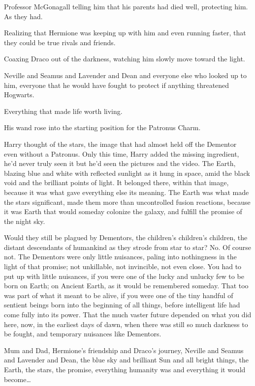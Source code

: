 Professor McGonagall telling him that his parents had died well, protecting 
him. As they had.

Realizing that Hermione was keeping up with him and even running faster, that 
they could be true rivals and friends.

Coaxing Draco out of the darkness, watching him slowly move toward the light.

Neville and Seamus and Lavender and Dean and everyone else who looked up to 
him, everyone that he would have fought to protect if anything threatened 
Hogwarts.

Everything that made life worth living.

His wand rose into the starting position for the Patronus Charm.

Harry thought of the stars, the image that had almost held off the Dementor 
even without a Patronus. Only this time, Harry added the missing ingredient, 
he'd never truly seen it but he'd seen the pictures and the video. The Earth, 
blazing blue and white with reflected sunlight as it hung in space, amid the 
black void and the brilliant points of light. It belonged there, within that 
image, because it was what gave everything else its meaning. The Earth was what 
made the stars significant, made them more than uncontrolled fusion reactions, 
because it was Earth that would someday colonize the galaxy, and fulfill the 
promise of the night sky.

Would they still be plagued by Dementors, the children's children's children, 
the distant descendants of humankind as they strode from star to star? No. Of 
course not. The Dementors were only little nuisances, paling into nothingness 
in the light of that promise; not unkillable, not invincible, not even close. 
You had to put up with little nuisances, if you were one of the lucky and 
unlucky few to be born on Earth; on Ancient Earth, as it would be remembered 
someday. That too was part of what it meant to be alive, if you were one of the 
tiny handful of sentient beings born into the beginning of all things, before 
intelligent life had come fully into its power. That the much vaster future 
depended on what you did here, now, in the earliest days of dawn, when there 
was still so much darkness to be fought, and temporary nuisances like Dementors.

Mum and Dad, Hermione's friendship and Draco's journey, Neville and Seamus and 
Lavender and Dean, the blue sky and brilliant Sun and all bright things, the 
Earth, the stars, the promise, everything humanity was and everything it would 
become{\ldots}

